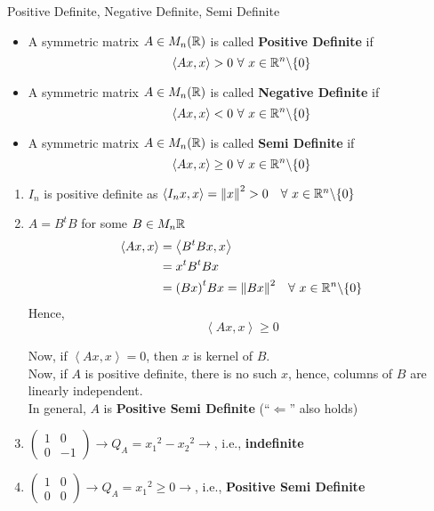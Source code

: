 \documentclass[../Analysis-3.tex]{subfiles}
\begin{document}
\begin{Def}{Positive Definite, Negative Definite, Semi Definite}{}
  \begin{itemize}
    \item A symmetric matrix $A \in M_n(\mathbb{R})$ is called \textbf{Positive Definite} if \[ \left\langle Ax, x \right\rangle > 0 \ \forall\ x \in \R^n \backslash \{0\} \]
    \item A symmetric matrix $A \in M_n(\mathbb{R})$ is called \textbf{Negative Definite} if \[ \left\langle Ax, x \right\rangle < 0 \ \forall\ x \in \R^n \backslash \{0\} \]
    \item A symmetric matrix $A \in M_n(\mathbb{R})$ is called \textbf{Semi Definite} if \[ \left\langle Ax, x \right\rangle \geq 0 \ \forall\ x \in \R^n \backslash \{0\} \]
  \end{itemize}
\end{Def}

\begin{Eg}{}{}
  \begin{enumerate}
    \item  $I_n$ is positive definite as $\left\langle I_nx, x \right\rangle = {\|x \|}^2 > 0 \quad \forall\ x \in \mathbb{R}^n \backslash \{0\}$
    \item $A = B^tB$ for some $B \in M_n{\mathbb{R}}$
          \begin{align*}
            \left\langle Ax,x \right\rangle & = \left\langle B^tBx,x \right\rangle                                    \\
                                            & = x^tB^tBx                                                              \\
                                            & = {(Bx)}^t Bx = {\| Bx \|}^2 \quad \forall\ x \in \mathbb{R}^n \backslash \{0\}
          \end{align*}
          Hence, \[ \left\langle Ax,x \right\rangle \geq 0 \]

          Now, if $ \left\langle Ax,x \right\rangle = 0 $, then  $x$ is kernel of $B$. \\
          Now, if $A$ is positive definite, there is no such $x$, hence, columns of $B$ are linearly independent. \\
          In general, $A$ is \textbf{Positive Semi Definite} (``$\Longleftarrow$'' also holds)

    \item $\begin{pmatrix}
              1 & 0  \\
              0 & -1
            \end{pmatrix} \longrightarrow Q_A = {x_1}^2 - {x_2}^2 \longrightarrow $, i.e., \textbf{indefinite}
    \item  $\begin{pmatrix}
              1 & 0 \\
              0 & 0
            \end{pmatrix} \longrightarrow Q_A = {x_1}^2 \geq 0 \longrightarrow $, i.e., \textbf{Positive Semi Definite}

  \end{enumerate}
\end{Eg}
\end{document}
